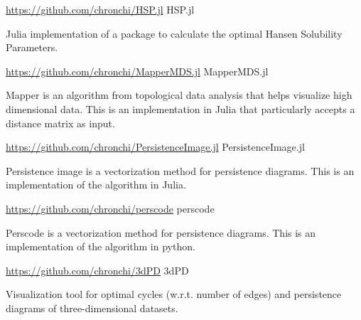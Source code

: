 \begin{cventries}
\cventry
  {\url{https://github.com/chronchi/HSP.jl}} %
  {HSP.jl} %
  {}{}
  {
    \begin{cvitems} %
      \item {Julia implementation of a package to calculate the
      optimal Hansen Solubility Parameters.}
    \end{cvitems}
  }

\cventry
  {\url{https://github.com/chronchi/MapperMDS.jl}} %
  {MapperMDS.jl} %
  {}{}
  {
    \begin{cvitems} %
      \item {Mapper is an algorithm from topological data analysis that
      helps visualize high dimensional data. This is
      an implementation in Julia that particularly accepts a distance matrix
      as input.}
    \end{cvitems}
  }

\cventry
  {\url{https://github.com/chronchi/PersistenceImage.jl}} %
  {PersistenceImage.jl} %
  {}{}
  {
    \begin{cvitems} %
      \item {Persistence image is a vectorization method for persistence
      diagrams. This is an implementation of the algorithm in Julia.}
    \end{cvitems}
  }

\cventry
  {\url{https://github.com/chronchi/perscode}} %
  {perscode} %
  {}{}
  {
    \begin{cvitems} %
      \item {Perscode is a vectorization method for persistence
      diagrams. This is an implementation of the algorithm in python.}
    \end{cvitems}
  }

\cventry
  {\url{https://github.com/chronchi/3dPD}} %
  {3dPD} %
  {}{}
  {
    \begin{cvitems} %
        \item {Visualization tool for optimal cycles (w.r.t. number of edges) and persistence
	       diagrams of three-dimensional datasets.}
    \end{cvitems}
  }

\end{cventries}
